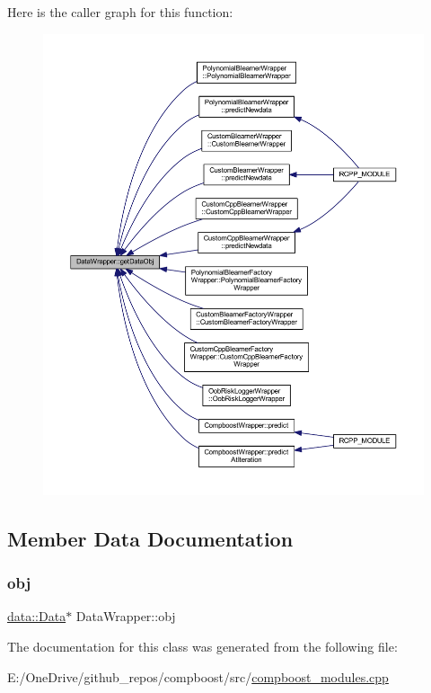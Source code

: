 Here is the caller graph for this function\+:\nopagebreak
\begin{figure}[H]
\begin{center}
\leavevmode
\includegraphics[width=350pt]{class_data_wrapper_a5e2993dd02f11ae2da8db95f942eca60_icgraph}
\end{center}
\end{figure}


\subsection{Member Data Documentation}
\mbox{\label{class_data_wrapper_aa7e20aa2db84194fd86c032583a93774}} 
\subsubsection{\texorpdfstring{obj}{obj}}
{\footnotesize\ttfamily \mbox{\hyperlink{classdata_1_1_data}{data\+::\+Data}}$\ast$ Data\+Wrapper\+::obj\hspace{0.3cm}{\ttfamily [protected]}}



The documentation for this class was generated from the following file\+:\begin{DoxyCompactItemize}
\item 
E\+:/\+One\+Drive/github\+\_\+repos/compboost/src/\mbox{\hyperlink{compboost__modules_8cpp}{compboost\+\_\+modules.\+cpp}}\end{DoxyCompactItemize}
